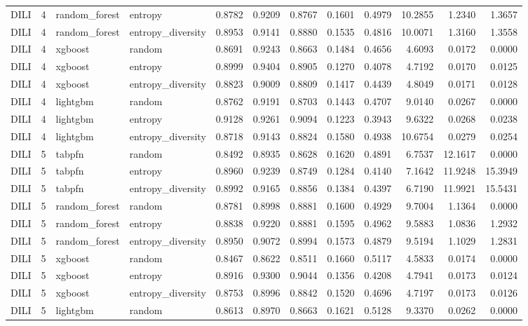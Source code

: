 \begin{tabular}{lrllrrrrrrrr}
DILI & 4 & random_forest & entropy & 0.8782 & 0.9209 & 0.8767 & 0.1601 & 0.4979 & 10.2855 & 1.2340 & 1.3657 \\
DILI & 4 & random_forest & entropy_diversity & 0.8953 & 0.9141 & 0.8880 & 0.1535 & 0.4816 & 10.0071 & 1.3160 & 1.3558 \\
DILI & 4 & xgboost & random & 0.8691 & 0.9243 & 0.8663 & 0.1484 & 0.4656 & 4.6093 & 0.0172 & 0.0000 \\
DILI & 4 & xgboost & entropy & 0.8999 & 0.9404 & 0.8905 & 0.1270 & 0.4078 & 4.7192 & 0.0170 & 0.0125 \\
DILI & 4 & xgboost & entropy_diversity & 0.8823 & 0.9009 & 0.8809 & 0.1417 & 0.4439 & 4.8049 & 0.0171 & 0.0128 \\
DILI & 4 & lightgbm & random & 0.8762 & 0.9191 & 0.8703 & 0.1443 & 0.4707 & 9.0140 & 0.0267 & 0.0000 \\
DILI & 4 & lightgbm & entropy & 0.9128 & 0.9261 & 0.9094 & 0.1223 & 0.3943 & 9.6322 & 0.0268 & 0.0238 \\
DILI & 4 & lightgbm & entropy_diversity & 0.8718 & 0.9143 & 0.8824 & 0.1580 & 0.4938 & 10.6754 & 0.0279 & 0.0254 \\
DILI & 5 & tabpfn & random & 0.8492 & 0.8935 & 0.8628 & 0.1620 & 0.4891 & 6.7537 & 12.1617 & 0.0000 \\
DILI & 5 & tabpfn & entropy & 0.8960 & 0.9239 & 0.8749 & 0.1284 & 0.4140 & 7.1642 & 11.9248 & 15.3949 \\
DILI & 5 & tabpfn & entropy_diversity & 0.8992 & 0.9165 & 0.8856 & 0.1384 & 0.4397 & 6.7190 & 11.9921 & 15.5431 \\
DILI & 5 & random_forest & random & 0.8781 & 0.8998 & 0.8881 & 0.1600 & 0.4929 & 9.7004 & 1.1364 & 0.0000 \\
DILI & 5 & random_forest & entropy & 0.8838 & 0.9220 & 0.8881 & 0.1595 & 0.4962 & 9.5883 & 1.0836 & 1.2932 \\
DILI & 5 & random_forest & entropy_diversity & 0.8950 & 0.9072 & 0.8994 & 0.1573 & 0.4879 & 9.5194 & 1.1029 & 1.2831 \\
DILI & 5 & xgboost & random & 0.8467 & 0.8622 & 0.8511 & 0.1660 & 0.5117 & 4.5833 & 0.0174 & 0.0000 \\
DILI & 5 & xgboost & entropy & 0.8916 & 0.9300 & 0.9044 & 0.1356 & 0.4208 & 4.7941 & 0.0173 & 0.0124 \\
DILI & 5 & xgboost & entropy_diversity & 0.8753 & 0.8996 & 0.8842 & 0.1520 & 0.4696 & 4.7197 & 0.0173 & 0.0126 \\
DILI & 5 & lightgbm & random & 0.8613 & 0.8970 & 0.8663 & 0.1621 & 0.5128 & 9.3370 & 0.0262 & 0.0000 \\

\end{tabular}
